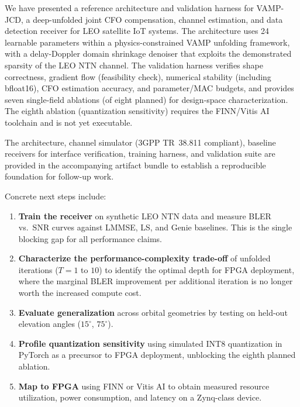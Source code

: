 \documentclass{article}
\begin{document}
We have presented a reference architecture and validation harness for VAMP-JCD, a deep-unfolded joint CFO compensation, channel estimation, and data detection receiver for LEO satellite IoT systems. The architecture uses 24 learnable parameters within a physics-constrained VAMP unfolding framework, with a delay-Doppler domain shrinkage denoiser that exploits the demonstrated sparsity of the LEO NTN channel. The validation harness verifies shape correctness, gradient flow (feasibility check), numerical stability (including bfloat16), CFO estimation accuracy, and parameter/MAC budgets, and provides seven single-field ablations (of eight planned) for design-space characterization. The eighth ablation (quantization sensitivity) requires the FINN/Vitis AI toolchain and is not yet executable.

The architecture, channel simulator (3GPP TR~38.811 compliant), baseline receivers for interface verification, training harness, and validation suite are provided in the accompanying artifact bundle to establish a reproducible foundation for follow-up work.

Concrete next steps include:

\begin{enumerate}
  \item \textbf{Train the receiver} on synthetic LEO NTN data and measure BLER vs.\ SNR curves against LMMSE, LS, and Genie baselines. This is the single blocking gap for all performance claims.
  \item \textbf{Characterize the performance-complexity trade-off} of unfolded iterations ($T = 1$ to $10$) to identify the optimal depth for FPGA deployment, where the marginal BLER improvement per additional iteration is no longer worth the increased compute cost.
  \item \textbf{Evaluate generalization} across orbital geometries by testing on held-out elevation angles ($15^\circ$, $75^\circ$).
  \item \textbf{Profile quantization sensitivity} using simulated INT8 quantization in PyTorch as a precursor to FPGA deployment, unblocking the eighth planned ablation.
  \item \textbf{Map to FPGA} using FINN or Vitis AI to obtain measured resource utilization, power consumption, and latency on a Zynq-class device.
\end{enumerate}

\end{document}
